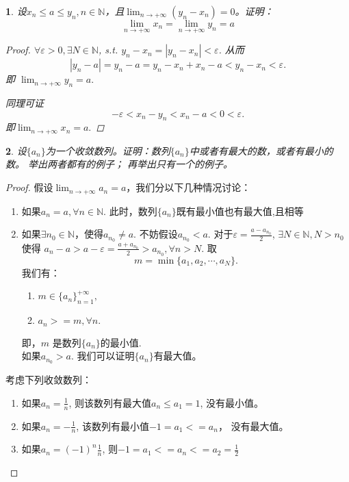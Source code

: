 \documentclass[utf8]{book}
\newtheorem{example}{}[section]             %
\begin{document}
\begin{example}

设$x_n \leq a \leq y_n, n \in \mathbb{N}$，且$\displaystyle \lim_{n\to +\infty}(y_n-x_n) = 0$。证明：
$$\displaystyle \lim_{n\to +\infty}x_n = \lim_{n\to +\infty}y_n = a$$

\begin{proof}
$\forall \varepsilon > 0, \exists N \in \mathbb{N}$, s.t. $y_n-x_n = \left | y_n - x_n\right | < \varepsilon$. 从而
$$\left| y_n - a\right| = y_n - a = y_n - x_n + x_n - a < y_n - x_n < \varepsilon.$$
即 $\displaystyle \lim_{n\to +\infty}y_n = a.$

同理可证
$$-\varepsilon < x_n - y_n < x_n - a < 0 < \varepsilon.$$ 即$\displaystyle \lim_{n\to +\infty}x_n = a.$

\end{proof}
\end{example}
\begin{example}
设$\{a_n\}$为一个收敛数列。证明：数列$\{a_n\}$中或者有最大的数，或者有最小的数。 举出两者都有的例子； 再举出只有一个的例子。
\end{example}
\begin{proof}
假设$\displaystyle \lim_{n\to +\infty}a_n = a$，我们分以下几种情况讨论：
\renewcommand\labelenumi{\normalfont(\theenumi)}
\begin{enumerate}
\item 如果$a_n = a,\forall n\in \mathbb{N}$. 此时，数列$\{a_n\}$既有最小值也有最大值,且相等
\item 如果$\exists n_{0} \in \mathbb{N}$，使得$a_{n_{0}} \neq a$. 不妨假设$a_{n_{0}} < a$. 对于$\varepsilon = \frac{a - a_{n_{0}}}{2}$, $\exists N\in \mathbb {N}, 
N > n_{0}$使得
$a_n - a > a - \varepsilon = \frac{a + a_{n_{0}}}{2} > a_{n_{0}}, \forall n > N$. 取
$$m = \min\{a_{1}, a_{2}, \cdots, a_{N}\}.$$
我们有：
\renewcommand\labelenumi{\normalfont(\theenumi)}
\begin{enumerate}
\item $m \in \{a_n\}_{n = 1}^{+\infty},$
\item $a_n >= m, \forall n.$
\end{enumerate}
即，$m$ 是数列$\{a_n\}$的最小值. \\
如果$a_{n_{0}} > a$. 我们可以证明$\{a_n\}$有最大值。
\end{enumerate}

考虑下列收敛数列：
\renewcommand\labelenumi{\normalfont(\theenumi)}
\begin{enumerate}
\item 如果$a_n = \frac{1}{n}$, 则该数列有最大值$a_n \leq a_1 = 1$, 没有最小值。
\item 如果$a_n = -\frac{1}{n}$, 该数列有最小值$-1 = a_1 <= a_n$， 没有最大值。
\item 如果$a_n =(-1)^n \frac{1}{n}$, 则$-1 = a_1 <= a_n <= a_2 = \frac{1}{2}$ 
\end{enumerate}

\end{proof}
\end{document}
